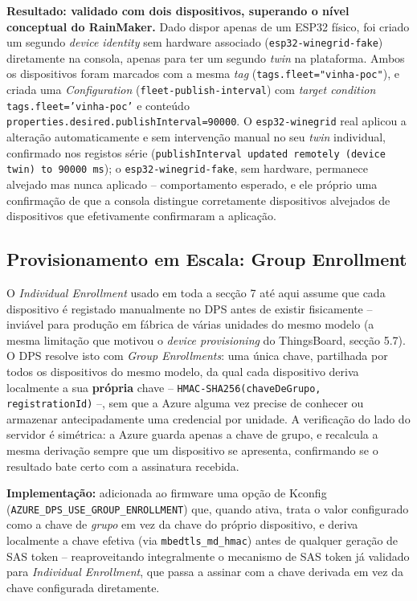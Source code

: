 \documentclass[a4paper,12pt]{article}
\begin{document}
\textbf{Resultado: validado com dois dispositivos, superando o nível conceptual do RainMaker.} Dado dispor apenas de um ESP32 físico, foi criado um segundo \textit{device identity} sem hardware associado (\texttt{esp32-winegrid-fake}) diretamente na consola, apenas para ter um segundo \textit{twin} na plataforma. Ambos os dispositivos foram marcados com a mesma \textit{tag} (\texttt{tags.fleet="vinha-poc"}), e criada uma \textit{Configuration} (\texttt{fleet-publish-interval}) com \textit{target condition} \texttt{tags.fleet='vinha-poc'} e conteúdo \texttt{properties.desired.publishInterval=90000}. O \texttt{esp32-winegrid} real aplicou a alteração automaticamente e sem intervenção manual no seu \textit{twin} individual, confirmado nos registos série (\texttt{publishInterval updated remotely (device twin) to 90000 ms}); o \texttt{esp32-winegrid-fake}, sem hardware, permanece alvejado mas nunca aplicado -- comportamento esperado, e ele próprio uma confirmação de que a consola distingue corretamente dispositivos alvejados de dispositivos que efetivamente confirmaram a aplicação.

\subsection{Provisionamento em Escala: Group Enrollment}
O \textit{Individual Enrollment} usado em toda a secção 7 até aqui assume que cada dispositivo é registado manualmente no DPS antes de existir fisicamente -- inviável para produção em fábrica de várias unidades do mesmo modelo (a mesma limitação que motivou o \textit{device provisioning} do ThingsBoard, secção 5.7). O DPS resolve isto com \textit{Group Enrollments}: uma única chave, partilhada por todos os dispositivos do mesmo modelo, da qual cada dispositivo deriva localmente a sua \textbf{própria} chave -- \texttt{HMAC-SHA256(chaveDeGrupo, registrationId)} --, sem que a Azure alguma vez precise de conhecer ou armazenar antecipadamente uma credencial por unidade. A verificação do lado do servidor é simétrica: a Azure guarda apenas a chave de grupo, e recalcula a mesma derivação sempre que um dispositivo se apresenta, confirmando se o resultado bate certo com a assinatura recebida.

\textbf{Implementação:} adicionada ao firmware uma opção de Kconfig (\texttt{AZURE\_DPS\_USE\_GROUP\_ENROLLMENT}) que, quando ativa, trata o valor configurado como a chave de \textit{grupo} em vez da chave do próprio dispositivo, e deriva localmente a chave efetiva (via \texttt{mbedtls\_md\_hmac}) antes de qualquer geração de SAS token -- reaproveitando integralmente o mecanismo de SAS token já validado para \textit{Individual Enrollment}, que passa a assinar com a chave derivada em vez da chave configurada diretamente.
\end{document}
